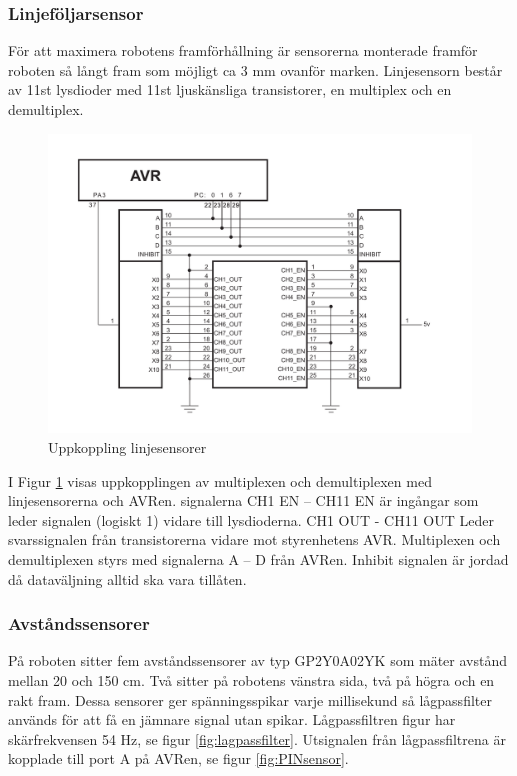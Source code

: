 \subsubsection{Linjeföljarsensor}
För att maximera robotens framförhållning är sensorerna monterade framför roboten 
så långt fram som möjligt ca 3 mm ovanför marken. Linjesensorn består av 11st lysdioder 
med 11st ljuskänsliga transistorer, en multiplex och en demultiplex.

\begin{figure}[H]
  \centering
 \includegraphics[angle=0,scale=0.5]{bilder/Uppkoppling_linjesensorer.pdf}
  \caption{Uppkoppling linjesensorer}
  \label{fig:Uppkoppling_linjesensorer}
\end{figure}


I Figur \ref{fig:Uppkoppling_linjesensorer} visas uppkopplingen av multiplexen och
demultiplexen  med linjesensorerna och AVRen. signalerna CH1 EN – CH11 EN 
är ingångar som leder signalen (logiskt 1) vidare till lysdioderna. 
CH1  OUT - CH11 OUT Leder svarssignalen från transistorerna vidare mot styrenhetens 
AVR. Multiplexen och demultiplexen styrs med signalerna A – D från AVRen. Inhibit 
signalen är jordad då dataväljning alltid ska vara tillåten.


\subsubsection{Avståndssensorer}
På roboten sitter fem avståndssensorer av typ GP2Y0A02YK som mäter avstånd
mellan 20 och 150 cm. Två sitter på robotens vänstra sida, två på högra och en
rakt fram. Dessa sensorer ger spänningsspikar varje millisekund så lågpassfilter
används för att få en jämnare signal utan spikar. Lågpassfiltren figur
har skärfrekvensen 54 Hz, se figur \ref{fig:lagpassfilter}. Utsignalen från
lågpassfiltrena är kopplade till port A på AVRen, se figur \ref{fig:PINsensor}.

